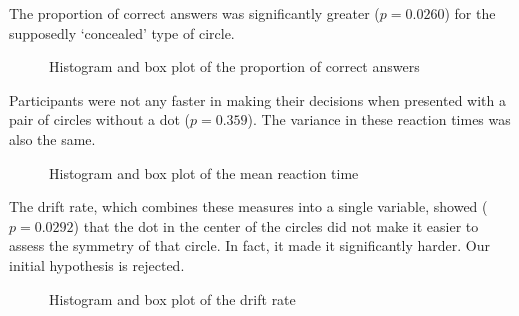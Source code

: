 \documentclass[a4paper,12pt]{article}
\numberwithin{equation}{section}
\begin{document}
\vspace{6mm}

The proportion of correct answers was significantly greater ($p=0.0260$) for the supposedly `concealed' type of circle.
\begin{figure}[h]
\begin{center}
\hspace{4mm}
\caption{Histogram and box plot of the proportion of correct answers}
\label{fig:Experiment 1/Figure 56}
\end{center}
\end{figure}

\newpage

Participants were not any faster in making their decisions when presented with a pair of circles without a dot ($p=0.359$). The variance in these reaction times was also the same.\begin{figure}[h]
\begin{center}
\hspace{4mm}
\caption{Histogram and box plot of the mean reaction time}
\label{fig:Experiment 1/Figure 78}
\end{center}
\end{figure}

The drift rate, which combines these measures into a single variable, showed ($p=0.0292$) that the dot in the center of the circles did not make it easier to assess the symmetry of that circle. In fact, it made it significantly harder. Our initial hypothesis is rejected.
\begin{figure}[h]
\begin{center}
\hspace{4mm}
\caption{Histogram and box plot of the drift rate}
\label{fig:Experiment 1/Figure 910}
\end{center}
\end{figure}
\end{document}
